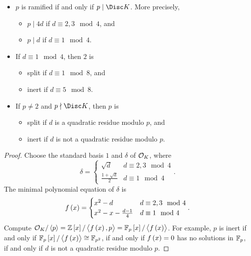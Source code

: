 
\begin{theorem}
\hfill
\begin{itemize}
\item $ p $ is ramified if and only if $ p \mid \Disc K $. More precisely,
\begin{itemize}
\item $ p \mid 4d $ if $ d \equiv 2, 3 \mod 4 $, and
\item $ p \mid d $ if $ d \equiv 1 \mod 4 $.
\end{itemize}
\item If $ d \equiv 1 \mod 4 $, then $ 2 $ is
\begin{itemize}
\item split if $ d \equiv 1 \mod 8 $, and
\item inert if $ d \equiv 5 \mod 8 $.
\end{itemize}
\item If $ p \ne 2 $ and $ p \nmid \Disc K $, then $ p $ is
\begin{itemize}
\item split if $ d $ is a quadratic residue modulo $ p $, and
\item inert if $ d $ is not a quadratic residue modulo $ p $.
\end{itemize}
\end{itemize}
\end{theorem}

\begin{proof}
Choose the standard basis $ 1 $ and $ \delta $ of $ \mathcal{O}_K $, where
$$ \delta =
\begin{cases}
\sqrt{d} & d \equiv 2, 3 \mod 4 \\
\tfrac{1 + \sqrt{d}}{2} & d \equiv 1 \mod 4
\end{cases}.
$$
The minimal polynomial equation of $ \delta $ is
$$ f\br{x} =
\begin{cases}
x^2 - d & d \equiv 2, 3 \mod 4 \\
x^2 - x - \tfrac{d - 1}{4} & d \equiv 1 \mod 4
\end{cases}.
$$
Compute $ \OOO_K / \abr{p} = \ZZ\sbr{x} / \abr{f\br{x}, p} = \FF_p\sbr{x} / \abr{f\br{x}} $. For example, $ p $ is inert if and only if $ \FF_p\sbr{x} / \abr{f\br{x}} \cong \FF_{p^2} $, if and only if $ f\br{x} = 0 $ has no solutions in $ \mathbb{F}_p $, if and only if $ d $ is not a quadratic residue modulo $ p $.
\end{proof}

